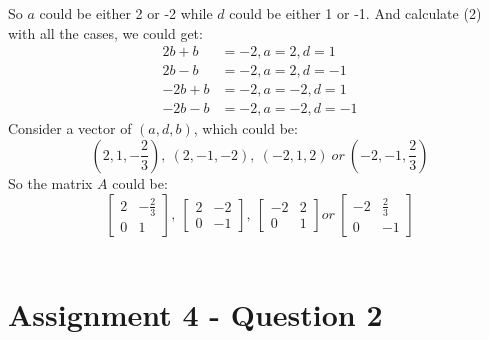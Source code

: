 \documentclass{article}
\begin{document}
So $a$ could be either 2 or -2 while $d$ could be either 1 or -1. 
And calculate (2) with all the cases, we could get:
$$
\begin{aligned}
2b + b &= -2, a = 2, d = 1\\
2b - b &= -2, a = 2, d = -1\\
-2b + b &= -2, a = -2, d = 1\\
-2b - b &= -2, a = -2, d = -1
\end{aligned}
$$
Consider a vector of $(a,d,b)$, which could be:
$$
(2,1,-\frac{2}{3}),\ (2,-1,-2),\ (-2,1,2) \ or \ (-2,-1,\frac{2}{3})
$$
So the matrix $A$ could be:
$$
\begin{bmatrix}
    2 & -\frac{2}{3}\\
    0 & 1
\end{bmatrix}
,\
\begin{bmatrix}
    2 & -2\\
    0 & -1
\end{bmatrix}
,\
\begin{bmatrix}
    -2 & 2\\
    0 & 1
\end{bmatrix}
or\
\begin{bmatrix}
    -2 & \frac{2}{3}\\
    0 & -1
\end{bmatrix}
$$
\\
\section*{Assignment 4 - Question 2}
\end{document}
